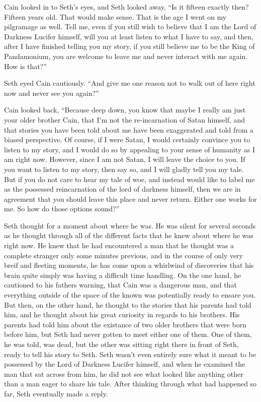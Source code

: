 \documentclass[12pt,twoside,titlepage]{report}
\begin{document}
Cain looked in to Seth's eyes, and Seth looked away, ``Is it fifteen
exactly then? Fifteen years old. That would make sense. That is the age
I went on my pilgramage as well. Tell me, even if you still wish to
believe that I am the Lord of Darkness Lucifer himself, will you at
least listen to what I have to say, and then, after I have finished
telling you my story, if you still believe me to be the King of
Pandamonium, you are welcome to leave me and never interact with me
again. How is that?''

Seth eyed Cain cautiously. ``And give me one reason not to walk out of
here right now and never see you again?''

Cain looked back, ``Because deep down, you know that maybe I really am
just your older brother Cain, that I'm not the re-incarnation of Satan
himself, and that stories you have been told about me have been
exaggerated and told from a biased perspective. Of course, if I were
Satan, I would certainly convince you to listen to my story, and I would
do so by appealing to your sense of humanity as I am right now. However,
since I am not Satan, I will leave the choice to you. If you want to
listen to my story, then say so, and I will gladly tell you my tale. But
if you do not care to hear my tale of woe, and instead would like to
label me as the possessed reincarnation of the lord of darkness himself,
then we are in agreement that you should leave this place and never
return. Either one works for me. So how do those options sound?''

Seth thought for a moment about where he was. He was silent for several
seconds as he thought through all of the different facts that he knew
about where he was right now. He knew that he had encountered a man that
he thought was a complete stranger only some minutes previous, and in
the course of only very breif and fleeting moments, he has come upon a
whirlwind of discoveries that his brain quite simply was having a
difficult time handling. On the one hand, he cautioned to his fathers
warning, that Cain was a dangerous man, and that everything outside of
the space of the known was potentially ready to ensare you. But then, on
the other hand, he thought to the stories that his parents had told him,
and he thought about his great curiosity in regards to his brothers. His
parents had told him about the existance of two older brothers that were
born before him, but Seth had never gotten to meet either one of them.
One of them, he was told, was dead, but the other was sitting right
there in front of Seth, ready to tell his story to Seth. Seth wasn't
even entirely sure what it meant to be possessed by the Lord of Darkness
Lucifer himself, and when he examined the man that sat across from him,
he did not see what looked like anything other than a man eager to share
his tale. After thinking through what had happened so far, Seth
eventually made a reply.
\end{document}
